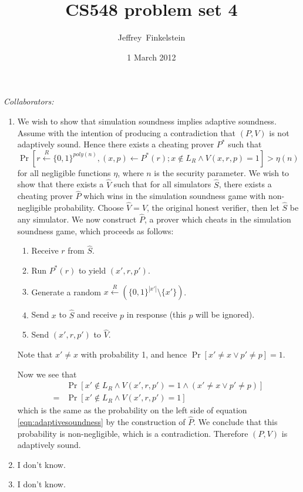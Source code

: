 \documentclass[draft]{article}
\author{Jef{}frey~Finkelstein}
\date{1 March 2012}
\title{CS548 problem set 4}
\newcommand{\collaborators}[1]{\emph{Collaborators: #1}}
\newcommand{\getr}{\overset{R}{\gets}}
\newcommand{\getrsingle}{\getr\{0, 1\}}
\newcommand{\getrpoly}{\getrsingle^{poly(n)}}
\begin{document}
\maketitle
\collaborators{}
\begin{enumerate}
\item
  We wish to show that simulation soundness implies adaptive soundness.
  Assume with the intention of producing a contradiction that $(P, V)$ is not adaptively sound.
  Hence there exists a cheating prover $P^*$ such that
  \begin{equation}\label{eqn:adaptivesoundness}
    \Pr\left[r\getrpoly, (x, p)\gets P^*(r); x\notin L_R \land V(x, r, p) = 1\right] > \eta(n)
  \end{equation}
  for all negligible functions $\eta$, where $n$ is the security parameter.
  We wish to show that there exists a $\hat{V}$ such that for all simulators $\hat{S}$, there exists a cheating prover $\hat{P}$ which wins in the simulation soundness game with non-negligible probability.
  Choose $\hat{V}=V$, the original honest verifier, then let $\hat{S}$ be any simulator.
  We now construct $\hat{P}$, a prover which cheats in the simulation soundness game, which proceeds as follows:
  \begin{enumerate}
  \item Receive $r$ from $\hat{S}$.
  \item Run $P^*(r)$ to yield $(x', r, p')$.
  \item Generate a random $x\getr(\{0,1\}^{|x'|}\setminus\{x'\})$.
  \item Send $x$ to $\hat{S}$ and receive $p$ in response (this $p$ will be ignored).
  \item Send $(x', r, p')$ to $\hat{V}$.
  \end{enumerate}
  Note that $x'\neq x$ with probability 1, and hence $\Pr[x'\neq x \lor p'\neq p]=1$.

  Now we see that
  \begin{align*}
    & \Pr\left[x'\notin L_R \land V(x', r, p')=1 \land (x'\neq x \lor p'\neq p)\right] \\
    = & \Pr\left[x'\notin L_R \land V(x', r, p')=1\right]
  \end{align*}
  which is the same as the probability on the left side of equation \ref{eqn:adaptivesoundness} by the construction of $\hat{P}$.
  We conclude that this probability is non-negligible, which is a contradiction.
  Therefore $(P, V)$ is adaptively sound.

\item I don't know.
\item I don't know.
\end{enumerate}
\end{document}

